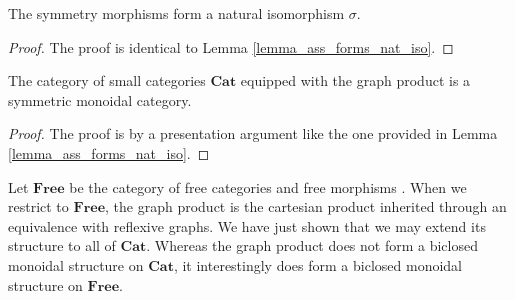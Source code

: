 \documentclass{tac}
\begin{document}
\begin{lemma}
The symmetry morphisms form a natural isomorphism $\sigma$.
\end{lemma}

\begin{proof}
The proof is identical to Lemma \ref{lemma_ass_forms_nat_iso}.
\end{proof}

\begin{theorem}
The category of small categories $\mathbf{Cat}$ equipped with the graph product is a symmetric monoidal category.
\end{theorem}

\begin{proof}
The proof is by a presentation argument like the one provided in Lemma \ref{lemma_ass_forms_nat_iso}.
\end{proof}
Let $\textbf{Free}$ be the category of free categories and free morphisms \cite{Campbell2026}. When we restrict to $\mathbf{Free}$, the graph product is the cartesian product inherited through an equivalence with reflexive graphs. We have just shown that we may extend its structure to all of $\textbf{Cat}$. Whereas the graph product does not form a biclosed monoidal structure on $\textbf{Cat}$, it interestingly does form a biclosed monoidal structure on $\textbf{Free}$.
\end{document}
